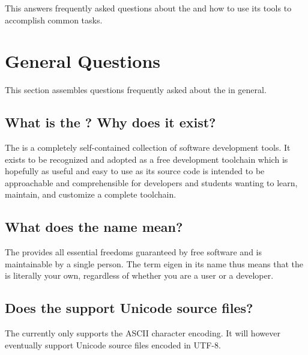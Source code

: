 





{This \documentation{} answers frequently asked questions about the \ecs{} and how to use its tools to accomplish common tasks.}

\newcommand{\question}[1]{\subsection*{#1}}

\section{General Questions}

This section assembles questions frequently asked about the \ecs{} in general.

\question{What is the \ecs{}? Why does it exist?}

The \ecs{} is a completely self-contained collection of software development tools.
It exists to be recognized and adopted as a free development toolchain which is hopefully as useful and easy to use as its source code is intended to be approachable and comprehensible for developers and students wanting to learn, maintain, and customize a complete toolchain.

\question{What does the name \ecs{} mean?}

The \ecs{} provides all essential freedoms guaranteed by free software and is maintainable by a single person.
The term eigen in its name thus means that the \ecs{} is literally your own, regardless of whether you are a user or a developer.

\question{Does the \ecs{} support Unicode source files?}

The \ecs{} currently only supports the ASCII character encoding.
It will however eventually support Unicode source files encoded in UTF-8.

